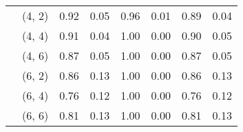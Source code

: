 \begin{tabular}{llrrrrrr}
    & (4, 2) &     0.92 & 0.05 &     0.96 & 0.01 &  0.89 & 0.04 \\
    & (4, 4) &     0.91 & 0.04 &     1.00 & 0.00 &  0.90 & 0.05 \\
    & (4, 6) &     0.87 & 0.05 &     1.00 & 0.00 &  0.87 & 0.05 \\
    & (6, 2) &     0.86 & 0.13 &     1.00 & 0.00 &  0.86 & 0.13 \\
    & (6, 4) &     0.76 & 0.12 &     1.00 & 0.00 &  0.76 & 0.12 \\
    & (6, 6) &     0.81 & 0.13 &     1.00 & 0.00 &  0.81 & 0.13 \\
\bottomrule
\end{tabular}

